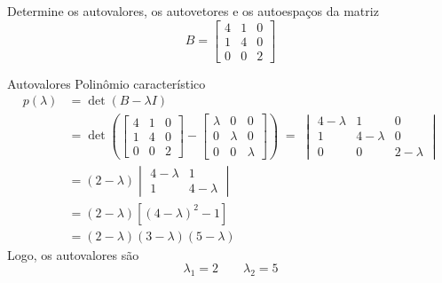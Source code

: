 \begin{question}
  Determine os autovalores, os autovetores e os autoespaços da matriz
  \[
    B =
    \begin{bmatrix}
      4 & 1 & 0 \\
      1 & 4 & 0 \\
      0 & 0 & 2
    \end{bmatrix}
  \]
\end{question}

\begin{resolution}{Autovalores}
  Polinômio característico
  \begin{align*}
    p(\lambda)
    & = \det(B-\lambda I) \\
    & = \det\left(
          \begin{bmatrix}
            4 & 1 & 0 \\
            1 & 4 & 0 \\
            0 & 0 & 2
          \end{bmatrix}
          -
          \begin{bmatrix}
            \lambda & 0       & 0       \\
            0       & \lambda & 0       \\
            0       & 0       & \lambda
          \end{bmatrix}
          \right)
    \;=\; \begin{vmatrix}
      4-\lambda & 1         & 0         \\
      1         & 4-\lambda & 0         \\
      0         & 0         & 2-\lambda
    \end{vmatrix}
    \\
    & = (2-\lambda)
      \begin{vmatrix}
        4-\lambda & 1         \\
        1         & 4-\lambda
      \end{vmatrix}\\
    & = (2 - \lambda) \left[ (4-\lambda)^2 - 1 \right] \\
    & = (2-\lambda)(3-\lambda)(5-\lambda)
  \end{align*}
  Logo, os autovalores são
  \[
    \lambda_{1} = 2
    \qquad
    \lambda_{2} = 5
  \]
\end{resolution}

